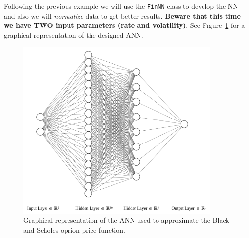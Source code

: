 Following the previous example we will use the \texttt{FinNN} class to develop the NN and also we will \emph{normalize} data to get better results. \textbf{Beware that this time we have TWO input parameters (rate and volatility)}. See Figure~\ref{fig:ann_2} for a graphical representation of the designed ANN.

\begin{figure}[htb]
	\centering
	\includegraphics[width=0.9\textwidth]{figures/ann_2.png}
	\caption{Graphical representation of the ANN used to approximate the Black and Scholes oprion price function.}
	\label{fig:ann_2}
\end{figure}

